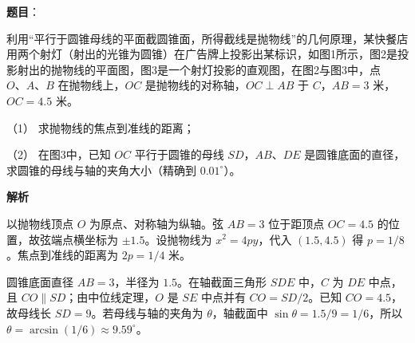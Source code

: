 \begin{answer}

\textbf{题目}：

利用“平行于圆锥母线的平面截圆锥面，所得截线是抛物线”的几何原理，某快餐店用两个射灯（射出的光锥为圆锥）在广告牌上投影出某标识，如图1所示，图2是投影射出的抛物线的平面图，图3是一个射灯投影的直观图，在图2与图3中，点 $O\text{、}A\text{、}B$ 在抛物线上，$OC$ 是抛物线的对称轴，$OC\perp AB$ 于 $C$，$AB=3$ 米，$OC=4.5$ 米。

（1） 求抛物线的焦点到准线的距离；

（2） 在图3中，已知 $OC$ 平行于圆锥的母线 $SD$，$AB\text{、}DE$ 是圆锥底面的直径，求圆锥的母线与轴的夹角大小（精确到 $0.01^\circ$）。
\nopagebreak[4]
\begin{center}\end{center}
\nopagebreak[4]
\nopagebreak[4]
\begin{center}\end{center}
\nopagebreak[4]
\nopagebreak[4]
\begin{center}\end{center}
\nopagebreak[4]
\textbf{解析}
\nopagebreak[4]
\begin{center}\end{center}
\nopagebreak[4]
\nopagebreak[4]
\begin{center}\end{center}
\nopagebreak[4]

以抛物线顶点 $O$ 为原点、对称轴为纵轴。弦 $AB=3$ 位于距顶点 $OC=4.5$ 的位置，故弦端点横坐标为 $\pm1.5$。设抛物线为 $x^2=4py$，代入 $(1.5,4.5)$ 得 $p=1/8$。焦点到准线的距离为 $2p=1/4$ 米。


圆锥底面直径 $AB=3$，半径为 $1.5$。在轴截面三角形 $SDE$ 中，$C$ 为 $DE$ 中点，且 $CO\parallel SD$；由中位线定理，$O$ 是 $SE$ 中点并有 $CO=SD/2$。已知 $CO=4.5$，故母线长 $SD=9$。若母线与轴的夹角为 $\theta$，轴截面中 $\sin\theta=1.5/9=1/6$，所以 $\theta=\arcsin(1/6)\approx9.59^\circ$。



\end{answer}
